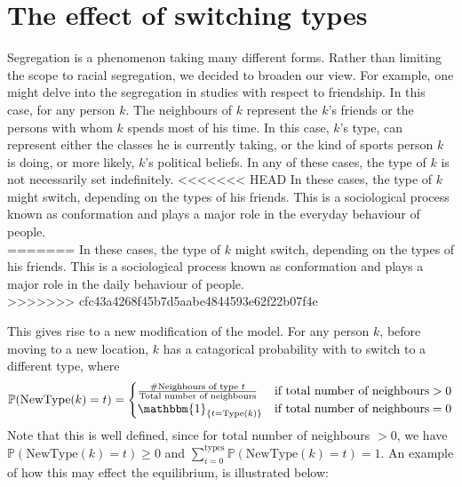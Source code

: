 \section{The effect of switching types}
\label{section:switch}
Segregation is a phenomenon taking many different forms. Rather than  limiting the scope to racial segregation, we decided to broaden our view. 
For example, one might delve into the segregation in studies with respect to friendship. 
In this case, for any person \(k\). The neighbours of \(k\) represent the \(k\)'s friends or the persons with whom \(k\) spends most of his time.
In this case, \(k\)'s type, can represent either the classes he is currently taking, or the kind of sports person \(k\) is doing, or more likely, \(k\)'s political beliefs.
In any of these cases, the type of \(k\) is not necessarily set indefinitely.
<<<<<<< HEAD
In these cases, the type of \(k\) might switch, depending on the types of his friends. This is a sociological process known as conformation and plays a major role in the everyday behaviour of people.\\
=======
In these cases, the type of \(k\) might switch, depending on the types of his friends. This is a sociological process known as conformation and plays a major role in the daily behaviour of people.\\
>>>>>>> cfc43a4268f45b7d5aabe4844593e62f22b07f4e

This gives rise to a new modification of the model.
For any person \(k\), before moving to a new location, \(k\) has a catagorical probability with to switch to a different type, where 
\[\mathbb{P}(\text{NewType}(k)=t) = \begin{cases} 
 \frac{\#\text{Neighbours of type }t}{\text{Total number of neighbours}}	&\mbox{if } \text{total number of neighbours}>0 \\ 
\mathbbm{1}_{\{t=\text{Type}(k)\}}   &\mbox{if } \text{total number of neighbours}=0
\end{cases}\]
Note that this is well defined, since for total number of neighbours \(> 0\), we have \( \mathbb{P}(\text{NewType}(k)=t) \geq 0\) and \(\sum_{i=0}^{\text{types}}\mathbb{P}(\text{NewType}(k)=t)=1\). An example of how this may effect the equilibrium, is illustrated below:

